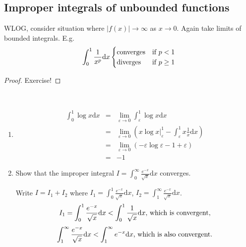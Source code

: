 \documentclass[12pt]{report}
\theoremstyle{definition}
\begin{document}
\subsection{Improper integrals of unbounded functions}
WLOG, consider situation where $|f(x)| \rightarrow \infty$ as $x \rightarrow 0$. Again take limits of bounded integrals.
E.g. \[
    \int_0^{1} \frac{1}{x^{p}}\mathrm{d}x 
    \begin{cases}
        \textnormal{converges} & \textnormal{if } p < 1\\
        \textnormal{diverges} & \textnormal{if } p \ge 1%
    \end{cases}
\]
\begin{proof}
    Exercise!
\end{proof}

\begin{ex}
    \,

    \begin{enumerate}[label = (\arabic*)]
        \item 
            \begin{eqnarray*}
                \int_0^{1} \log{x} \mathrm{d}x 
                &=& \lim_{\varepsilon \rightarrow 0} \int_\varepsilon^{1} \log{x} \mathrm{d}x \\
                &=& \lim_{\varepsilon \rightarrow 0} (x\log{x}|_\varepsilon^{1} - 
                \int_\varepsilon^{1} x \frac{1}{x}\mathrm{d}x) \\
                &=& \lim_{\varepsilon \rightarrow 0} (-\varepsilon\log{\varepsilon} - 1 + \varepsilon) \\
                &=& -1
            \end{eqnarray*}
        \item Show that the improper integral $I = \int_0^{\infty} \frac{e^{-x}}{\sqrt{x}}\mathrm{d}x$ converges.

            Write $I = I_1 + I_2$ where $I_1 = \int_0^{1} \frac{e^{-x}}{\sqrt{x}} \mathrm{d}x$, 
            $I_2 = \int_1^{\infty} \frac{e^{-x}}{\sqrt{x}} \mathrm{d}x$.\[
                I_1 = \int_0^{1} \frac{e^{-x}}{\sqrt{x}}\mathrm{d}x < \int_0^{1} \frac{1}{\sqrt{x}} \mathrm{d}x
                \textnormal{, which is convergent,}
            \]\[
            \int_1^{\infty} \frac{e^{-x}}{\sqrt{x}} \mathrm{d}x < \int_1^{\infty} e^{-x} \mathrm{d}x
            \textnormal{, which is also convergent.}
            \]
    \end{enumerate}
\end{ex}
\end{document}
